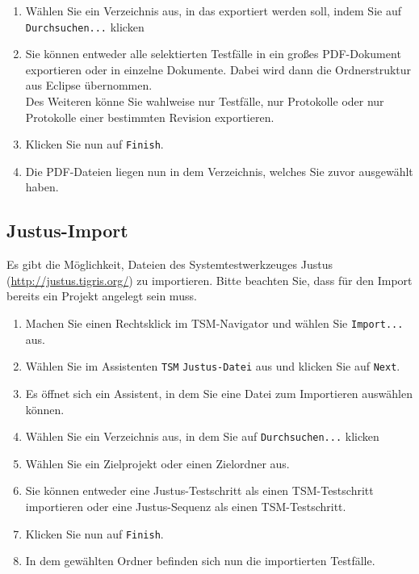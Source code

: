 \documentclass[11pt,a4paper,titlepage]{article}
\begin{document}
\begin{enumerate}
\item Wählen Sie ein Verzeichnis aus, in das exportiert werden soll, indem Sie auf \texttt{Durchsuchen...} klicken
\item Sie können entweder alle selektierten Testfälle in ein großes PDF-Dokument exportieren oder in einzelne Dokumente. Dabei wird dann die Ordnerstruktur aus Eclipse übernommen.\\
Des Weiteren könne Sie wahlweise nur Testfälle, nur Protokolle oder nur Protokolle einer bestimmten Revision exportieren. 
\item Klicken Sie nun auf \texttt{Finish}.
\item Die PDF-Dateien liegen nun in dem Verzeichnis, welches Sie zuvor ausgewählt haben.
\end{enumerate}

\subsection{Justus-Import}
Es gibt die Möglichkeit, Dateien des Systemtestwerkzeuges Justus (\url{http://justus.tigris.org/}) zu importieren. Bitte beachten Sie, dass für den Import bereits ein Projekt angelegt sein muss. 
\begin{enumerate}
\item Machen Sie einen Rechtsklick im TSM-Navigator und wählen Sie \texttt{Import...} aus.
\item Wählen Sie im Assistenten \texttt{TSM} \texttt{Justus-Datei} aus und klicken Sie auf \texttt{Next}.
\item Es öffnet sich ein Assistent, in dem Sie eine Datei zum Importieren auswählen können. 
\item Wählen Sie ein Verzeichnis aus, in dem Sie auf \texttt{Durchsuchen...} klicken
\item Wählen Sie ein Zielprojekt oder einen Zielordner aus.
\item Sie können entweder eine Justus-Testschritt als einen TSM-Testschritt importieren oder eine Justus-Sequenz als einen TSM-Testschritt. 
\item Klicken Sie nun auf \texttt{Finish}.
\item In dem gewählten Ordner befinden sich nun die importierten Testfälle. 
\end{enumerate}
\end{document}
